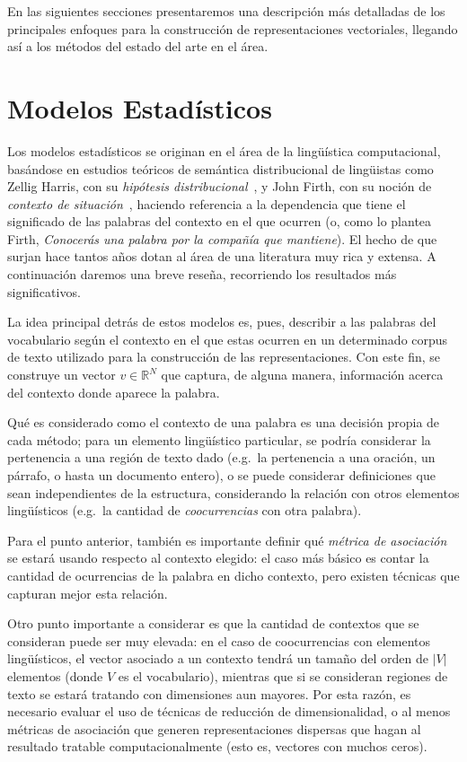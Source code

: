 En las siguientes secciones presentaremos una descripción más detalladas de los principales enfoques
para la construcción de representaciones vectoriales, llegando así a los métodos del estado del arte
en el área.


\section{Modelos Estadísticos}

Los modelos estadísticos se originan en el área de la lingüística computacional, basándose en
estudios teóricos de semántica distribucional de lingüistas como Zellig Harris, con su
\textit{hipótesis distribucional}~\cite{Harris1954}, y John Firth, con su noción de \textit{contexto de
situación}~\cite{Firth1957}, haciendo referencia a la dependencia que tiene el significado de las
palabras del contexto en el que ocurren (o, como lo plantea Firth, \textit{Conocerás una palabra por
la compañía que mantiene}). El hecho de que surjan hace tantos años dotan al área de una literatura
muy rica y extensa. A continuación daremos una breve reseña, recorriendo los resultados más
significativos.

La idea principal detrás de estos modelos es, pues, describir a las palabras del vocabulario según
el contexto en el que estas ocurren en un determinado corpus de texto utilizado para la construcción
de las representaciones. Con este fin, se construye un vector $v \in \mathbb{R}^N$ que captura, de
alguna manera, información acerca del contexto donde aparece la palabra.

Qué es considerado como el contexto de una palabra es una decisión propia de cada método; para un elemento
lingüístico particular, se podría considerar la pertenencia a una región de texto dado (e.g.\ la
pertenencia a una oración, un párrafo, o hasta un documento entero), o se puede considerar
definiciones que sean independientes de la estructura, considerando la relación con otros elementos
lingüísticos (e.g.\ la cantidad de \textit{coocurrencias} con otra palabra).

Para el punto anterior, también es importante definir qué \textit{métrica de asociación} se estará
usando respecto al contexto elegido: el caso más básico es contar la cantidad de ocurrencias de la
palabra en dicho contexto, pero existen técnicas que capturan mejor esta relación.

Otro punto importante a considerar es que la cantidad de contextos que se consideran puede ser muy
elevada: en el caso de coocurrencias con elementos lingüísticos, el vector asociado a un contexto
tendrá un tamaño del orden de $|V|$ elementos (donde $V$ es el vocabulario), mientras que si se
consideran regiones de texto se estará tratando con dimensiones aun mayores. Por esta razón, es
necesario evaluar el uso de técnicas de reducción de dimensionalidad, o al menos métricas de
asociación que generen representaciones dispersas que hagan al resultado tratable computacionalmente
(esto es, vectores con muchos ceros).


